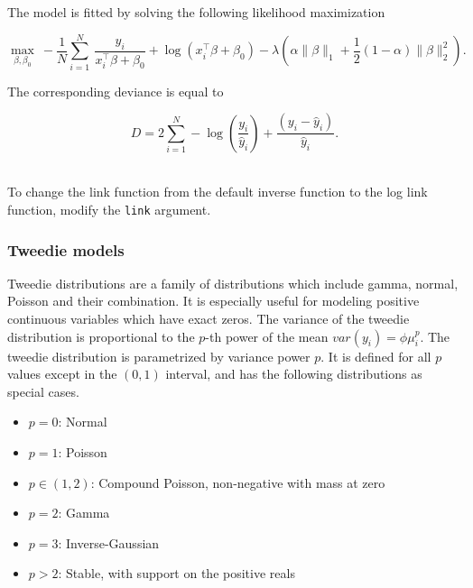 The model is fitted by solving the following likelihood maximization

$$  \max_{\beta,\beta_0} \  - \frac{1}{N}  \sum_{i=1}^N  \ \frac{y_i}{x_i^{\top}\beta+\beta_0 } + \log(x_i^{\top}\beta + \beta_0) -\lambda \left(  \alpha \| \beta \|_1 + \frac{1}{2}(1-\alpha)\| \beta \|_2^2  \right). $$

The corresponding deviance is equal to

$$D = 2\sum_{i=1}^{N} - \log\left({\frac{ y_i }{\hat{y}_i}}\right) + \frac{(y_i - \hat{y}_i)}{\hat{y}_i}. $$

\waterExampleInR
\\
To change the link function from the default inverse function to the log link function, modify the \texttt{link}
argument.
\bigskip


\waterExampleInPython


\subsubsection{Tweedie models}

Tweedie distributions are a family of distributions which include gamma, normal, Poisson and their combination. It is especially useful for modeling positive continuous variables which have exact zeros. The variance of the tweedie distribution is proportional to the $p$-th power of the mean $var(y_i)=\phi \mu_i^p$. The tweedie distribution is parametrized by variance power $p$. It is defined for all $p$ values except in the $(0,1)$ interval, and has the following distributions as special cases.

\begin{itemize}
\item  $p=0$: Normal
\item  $p=1$: Poisson
\item $p\in(1, 2)$: Compound Poisson, non-negative with mass at zero
\item $p=2$: Gamma
\item $p=3$: Inverse-Gaussian
\item $p>2$:  Stable, with support on the positive reals %
\end{itemize}

